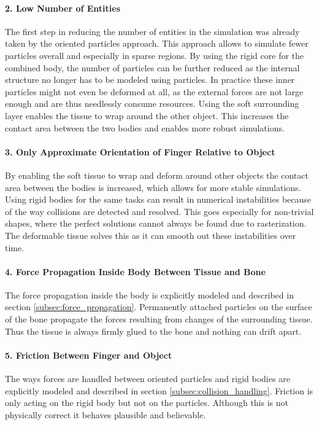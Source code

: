 \paragraph{2. Low Number of Entities}

The first step in reducing the number of entities in the simulation was already taken by the oriented particles approach. This approach allows to simulate fewer particles overall and especially in sparse regions. By using the rigid core for the combined body, the number of particles can be further reduced as the internal structure no longer has to be modeled using particles. In practice these inner particles might not even be deformed at all, as the external forces are not large enough and are thus needlessly consume resources. Using the soft surrounding layer enables the tissue to wrap around the other object. This increases the contact area between the two bodies and enables more robust simulations.

\paragraph{3. Only Approximate Orientation of Finger Relative to Object}

By enabling the soft tissue to wrap and deform around other objects the contact area between the bodies is increased, which allows for more stable simulations. Using rigid bodies for the same tasks can result in numerical instabilities because of the way collisions are detected and resolved. This goes especially for non-trivial shapes, where the perfect solutions cannot always be found due to rasterization. The deformable tissue solves this as it can smooth out these instabilities over time.

\paragraph{4. Force Propagation Inside Body Between Tissue and Bone}

The force propagation inside the body is explicitly modeled and described in section \ref{subsec:force_propagation}. Permanently attached particles on the surface of the bone propagate the forces resulting from changes of the surrounding tissue. Thus the tissue is always firmly glued to the bone and nothing can drift apart.

\paragraph{5. Friction Between Finger and Object}

The ways forces are handled between oriented particles and rigid bodies are explicitly modeled and described in section \ref{subsec:collision_handling}. Friction is only acting on the rigid body but not on the particles. Although this is not physically correct it behaves plausible and believable.
